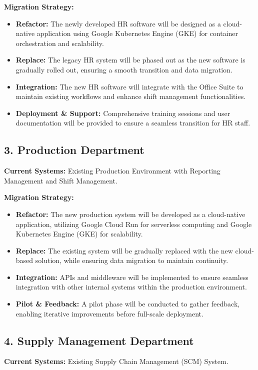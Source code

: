 \textbf{Migration Strategy:}
\begin{itemize}
    \item \textbf{Refactor:} The newly developed HR software will be designed as a cloud-native application using Google Kubernetes Engine (GKE) for container orchestration and scalability.
    \item \textbf{Replace:} The legacy HR system will be phased out as the new software is gradually rolled out, ensuring a smooth transition and data migration.
    \item \textbf{Integration:} The new HR software will integrate with the Office Suite to maintain existing workflows and enhance shift management functionalities.
    \item \textbf{Deployment \& Support:} Comprehensive training sessions and user documentation will be provided to ensure a seamless transition for HR staff.
\end{itemize}

\subsection{3. Production Department} 
\textbf{Current Systems:} Existing Production Environment with Reporting Management and Shift Management.

\textbf{Migration Strategy:}
\begin{itemize}
    \item \textbf{Refactor:} The new production system will be developed as a cloud-native application, utilizing Google Cloud Run for serverless computing and Google Kubernetes Engine (GKE) for scalability.
    \item \textbf{Replace:} The existing system will be gradually replaced with the new cloud-based solution, while ensuring data migration to maintain continuity.
    \item \textbf{Integration:} APIs and middleware will be implemented to ensure seamless integration with other internal systems within the production environment.
    \item \textbf{Pilot \& Feedback:} A pilot phase will be conducted to gather feedback, enabling iterative improvements before full-scale deployment.
\end{itemize}

\subsection{4. Supply Management Department} 
\textbf{Current Systems:} Existing Supply Chain Management (SCM) System.


